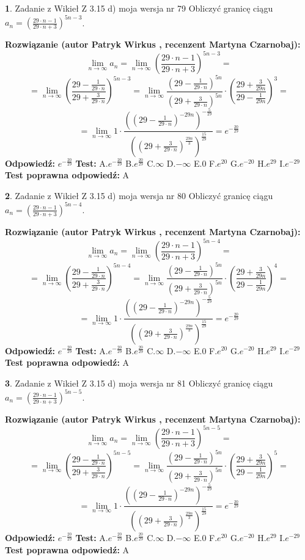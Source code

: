 \documentclass[12pt, a4paper]{article}
\theoremstyle{definition} %
\newtheorem{zad}{}
\newcommand{\zadStart}[1]{\begin{zad}#1\newline}
\newcommand{\zadStop}{\end{zad}}
\newcommand{\rozwStart}[2]{\noindent \textbf{Rozwiązanie (autor #1 , recenzent #2): }\newline}
\newcommand{\rozwStop}{\newline}
\newcommand{\odpStart}{\noindent \textbf{Odpowiedź:}\newline}
\newcommand{\odpStop}{\newline}
\newcommand{\testStart}{\noindent \textbf{Test:}\newline}
\newcommand{\testStop}{\newline}
\newcommand{\kluczStart}{\noindent \textbf{Test poprawna odpowiedź:}\newline}
\newcommand{\kluczStop}{\newline}
\begin{document}
\zadStart{Zadanie z Wikieł Z 3.15 d) moja wersja nr 79}
Obliczyć granicę ciągu $a_{n}=(\frac{29\cdot n - 1}{29 \cdot n + 3})^{5n-3}$.
\zadStop
\rozwStart{Patryk Wirkus}{Martyna Czarnobaj}
$$\lim\limits_{n\to\infty} a_{n} = \lim\limits_{n\to\infty}(\frac{29\cdot n - 1}{29 \cdot n + 3})^{5n-3}=$$
$$=\lim\limits_{n\to\infty}(\frac{29 - \frac{1}{29\cdot n}}{29 + \frac{3}{29 \cdot n}})^{5n-3}=\lim\limits_{n\to\infty}\frac{(29 - \frac{1}{29\cdot n})^{5n}}{(29 + \frac{3}{29\cdot n})^{5n}} \cdot (\frac{29+\frac{3}{29n}}{29-\frac{1}{29n}})^{3}=$$
$$=\lim\limits_{n\to\infty} 1 \cdot \frac{((29-\frac{1}{29 \cdot n})^{-29n})^{-\frac{5}{29}}}{((29+\frac{3}{29 \cdot n})^{\frac{29n}{3}})^{\frac{15}{29}}} =e^{-\frac{20}{29}}$$
\rozwStop
\odpStart
$e^{-\frac{20}{29}}$
\odpStop
\testStart
A.$ e^{-\frac{20}{29}}$
B.$ e^{\frac{20}{29}}$
C.$\infty$
D.$-\infty$
E.$0$
F.$e^{20}$
G.$e^{-20}$
H.$e^{29}$
I.$e^{-29}$
\testStop
\kluczStart
A
\kluczStop



\zadStart{Zadanie z Wikieł Z 3.15 d) moja wersja nr 80}
Obliczyć granicę ciągu $a_{n}=(\frac{29\cdot n - 1}{29 \cdot n + 3})^{5n-4}$.
\zadStop
\rozwStart{Patryk Wirkus}{Martyna Czarnobaj}
$$\lim\limits_{n\to\infty} a_{n} = \lim\limits_{n\to\infty}(\frac{29\cdot n - 1}{29 \cdot n + 3})^{5n-4}=$$
$$=\lim\limits_{n\to\infty}(\frac{29 - \frac{1}{29\cdot n}}{29 + \frac{3}{29 \cdot n}})^{5n-4}=\lim\limits_{n\to\infty}\frac{(29 - \frac{1}{29\cdot n})^{5n}}{(29 + \frac{3}{29\cdot n})^{5n}} \cdot (\frac{29+\frac{3}{29n}}{29-\frac{1}{29n}})^{4}=$$
$$=\lim\limits_{n\to\infty} 1 \cdot \frac{((29-\frac{1}{29 \cdot n})^{-29n})^{-\frac{5}{29}}}{((29+\frac{3}{29 \cdot n})^{\frac{29n}{3}})^{\frac{15}{29}}} =e^{-\frac{20}{29}}$$
\rozwStop
\odpStart
$e^{-\frac{20}{29}}$
\odpStop
\testStart
A.$ e^{-\frac{20}{29}}$
B.$ e^{\frac{20}{29}}$
C.$\infty$
D.$-\infty$
E.$0$
F.$e^{20}$
G.$e^{-20}$
H.$e^{29}$
I.$e^{-29}$
\testStop
\kluczStart
A
\kluczStop



\zadStart{Zadanie z Wikieł Z 3.15 d) moja wersja nr 81}
Obliczyć granicę ciągu $a_{n}=(\frac{29\cdot n - 1}{29 \cdot n + 3})^{5n-5}$.
\zadStop
\rozwStart{Patryk Wirkus}{Martyna Czarnobaj}
$$\lim\limits_{n\to\infty} a_{n} = \lim\limits_{n\to\infty}(\frac{29\cdot n - 1}{29 \cdot n + 3})^{5n-5}=$$
$$=\lim\limits_{n\to\infty}(\frac{29 - \frac{1}{29\cdot n}}{29 + \frac{3}{29 \cdot n}})^{5n-5}=\lim\limits_{n\to\infty}\frac{(29 - \frac{1}{29\cdot n})^{5n}}{(29 + \frac{3}{29\cdot n})^{5n}} \cdot (\frac{29+\frac{3}{29n}}{29-\frac{1}{29n}})^{5}=$$
$$=\lim\limits_{n\to\infty} 1 \cdot \frac{((29-\frac{1}{29 \cdot n})^{-29n})^{-\frac{5}{29}}}{((29+\frac{3}{29 \cdot n})^{\frac{29n}{3}})^{\frac{15}{29}}} =e^{-\frac{20}{29}}$$
\rozwStop
\odpStart
$e^{-\frac{20}{29}}$
\odpStop
\testStart
A.$ e^{-\frac{20}{29}}$
B.$ e^{\frac{20}{29}}$
C.$\infty$
D.$-\infty$
E.$0$
F.$e^{20}$
G.$e^{-20}$
H.$e^{29}$
I.$e^{-29}$
\testStop
\kluczStart
A
\kluczStop
\end{document}
